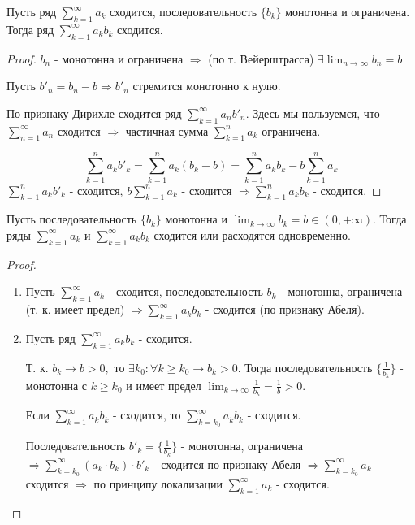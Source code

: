 	\begin{theorem}
		Пусть ряд $\displaystyle \sum_{k = 1}^{\infty} {a_k}$ сходится, последовательность $\{b_k\}$ монотонна и ограничена. Тогда ряд $\displaystyle \sum_{k = 1}^{\infty} a_k b_k$ сходится.
	\end{theorem}
	
	\begin{proof}
		$b_n$ - монотонна и ограничена $\Rightarrow$ (по т. Вейерштрасса) $\exists \lim_{n \to \infty} b_n = b$
		
		Пусть $b'_n = b_n - b \Rightarrow b'_n$ стремится монотонно к нулю.
		
		По признаку Дирихле сходится ряд $\sum_{k = 1}^{\infty} a_n b'_n$. Здесь мы пользуемся, что $\sum_{n = 1}^{\infty} a_n$ сходится $\Rightarrow$ частичная сумма $\sum_{k = 1}^{n} a_k$ ограничена.
		
		\[ \sum_{k = 1}^n a_k b'_k = \sum_{k = 1}^n a_k (b_k - b) = \sum_{k = 1}^n a_k b_k - b \sum_{k = 1}^n a_k \]
		$\sum_{k = 1}^n a_k b'_k$ - сходится, $b \sum_{k = 1}^n a_k$ - сходится $\Rightarrow \sum_{k = 1}^n a_k b_k$ - сходится.
	\end{proof}
	
	\begin{corollary}
		Пусть последовательность $\{b_k\}$ монотонна и $\displaystyle \lim_{k \to \infty} {b_k} = b \in (0, +\infty)$. Тогда ряды $\displaystyle \sum_{k = 1}^{\infty} a_k$ и $\displaystyle \sum_{k = 1}^{\infty} a_k b_k$ сходится или расходятся одновременно.
	\end{corollary}
	
	\begin{proof}
		\begin{enumerate}
			\item Пусть $\sum_{k = 1}^{\infty} a_k$ - сходится, последовательность $b_k$ - монотонна, ограничена (т. к. имеет предел) $\Rightarrow \sum_{k = 1}^{\infty} a_k b_k$ - сходится (по признаку Абеля).
			\item Пусть ряд $\sum_{k = 1}^{\infty} a_k b_k$ - сходится.
			
			Т. к. $b_k \to b > 0,$ то $\exists k_0: \forall k \geqslant k_0 \rightarrow b_k > 0$. Тогда последовательность $\{\frac{1}{b_k}\}$ - монотонна с $k \geqslant k_0$ и имеет предел $\lim_{k \to \infty} \frac{1}{b_k} = \frac{1}{b} > 0$.
			
			Если $\sum_{k = 1}^{\infty} a_k b_k$ - сходится, то $\sum_{k = k_0}^{\infty} a_k b_k$ - сходится.
			
			Последовательность $b'_k = \{\frac{1}{b_k}\}$ - монотонна, ограничена $\Rightarrow \sum_{k = k_0}^{\infty} (a_k \cdot b_k) \cdot b'_k$ - сходится по признаку Абеля $\Rightarrow \sum_{k = k_0}^{\infty} a_k$ - сходится $\Rightarrow$ по принципу локализации $\sum_{k = 1}^{\infty} a_k$ - сходится.
		\end{enumerate}
	\end{proof}
	
